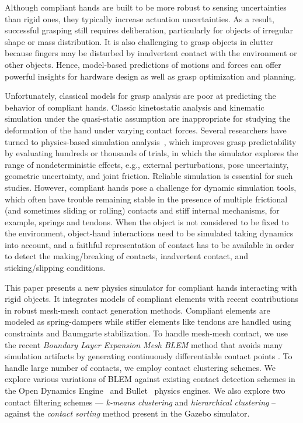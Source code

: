 Although compliant hands are built to be more robust to sensing uncertainties than rigid ones, they typically increase actuation uncertainties. As a result, successful grasping still requires deliberation, particularly for objects of irregular shape or mass distribution. It is also challenging to grasp objects in clutter because fingers may be disturbed by inadvertent contact with the environment or other objects. Hence, model-based predictions of motions and forces can offer powerful insights for hardware design as well as grasp optimization and planning.

Unfortunately, classical models for grasp analysis are poor at predicting the behavior of compliant hands. Classic kinetostatic analysis and kinematic simulation under the quasi-static assumption are inappropriate for studying the deformation of the hand under varying contact forces.  Several researchers have turned to physics-based simulation analysis~\cite{Kappler15, JunggonKim13}, which improves grasp predictability by evaluating hundreds or thousands of trials, in which the simulator explores the range of nondeterministic effects, e.g., external perturbations, pose uncertainty, geometric uncertainty, and joint friction. Reliable simulation is essential for such studies. However, compliant hands pose a challenge for dynamic simulation tools, which often have trouble remaining stable in the presence of multiple frictional (and sometimes sliding or rolling) contacts and stiff internal mechanisms, for example, springs and tendons. When the object is not considered to be fixed to the environment, object-hand interactions need to be simulated taking dynamics into account, and a faithful representation of contact has to be available in order to detect the making/breaking of contacts, inadvertent contact, and sticking/slipping conditions. 

This paper presents a new physics simulator for compliant hands interacting with rigid objects. It integrates models of compliant elements with recent contributions in robust mesh-mesh contact generation methods.  Compliant elements are modeled as spring-dampers while stiffer elements like tendons are handled using constraints and Baumgarte stabilization.  To handle mesh-mesh contact, we use the recent \emph{Boundary Layer Expansion Mesh} \emph{BLEM} method that avoids many simulation artifacts by generating continuously differentiable contact points \cite{Hauser13BLEM}. To handle large number of contacts, we employ contact clustering schemes. We explore various variations of BLEM against existing contact detection schemes in the {Open Dynamics Engine}~\cite{opende} and Bullet~\cite{bulletpe} physics engines. We also explore two contact filtering schemes ---  \emph{k-means clustering} and \emph{hierarchical clustering} -- against the \emph{contact sorting} method present in the Gazebo simulator. 

